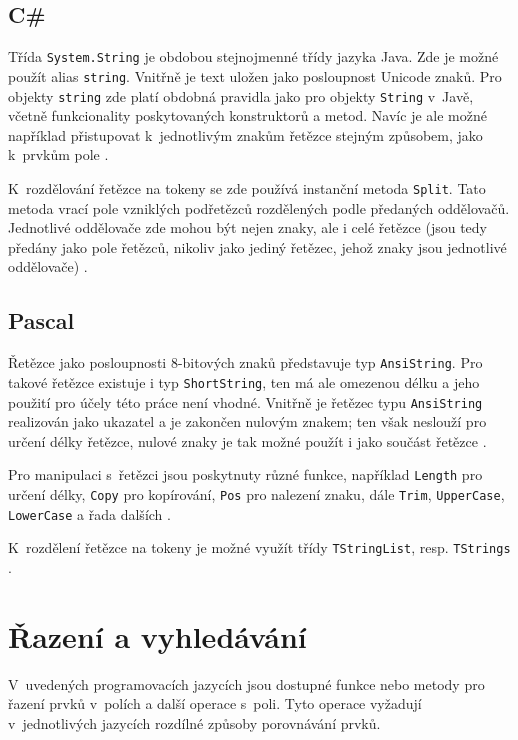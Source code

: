 \documentclass{bakalarka}
\begin{document}
\subsection{C\#}
Třída \texttt{System.String} je obdobou stejnojmenné třídy jazyka Java. Zde je možné použít alias \texttt{string}. Vnitřně je text uložen jako posloupnost Unicode znaků. Pro objekty \texttt{string} zde platí obdobná pravidla jako pro objekty \texttt{String} v~Javě, včetně funkcionality poskytovaných konstruktorů a metod. Navíc je ale možné například přistupovat k~jednotlivým znakům řetězce stejným způsobem, jako k~prvkům pole \cite{cs-guide-stringclass}.\par
K~rozdělování řetězce na tokeny se zde používá instanční metoda \texttt{Split}. Tato metoda vrací pole vzniklých podřetězců rozdělených podle předaných oddělovačů. Jednotlivé oddělovače zde mohou být nejen znaky, ale i celé řetězce (jsou tedy předány jako pole řetězců, nikoliv jako jediný řetězec, jehož znaky jsou jednotlivé oddělovače) \cite{cs-guide-stringsplit}.

\subsection{Pascal}
Řetězce jako posloupnosti 8-bitových znaků představuje typ \texttt{AnsiString}. Pro takové řetězce existuje i typ \texttt{ShortString}, ten má ale omezenou délku a jeho použití pro účely této práce není vhodné. Vnitřně je řetězec typu \texttt{AnsiString} realizován jako ukazatel a je zakončen nulovým znakem; ten však neslouží pro určení délky řetězce, nulové znaky je tak možné použít i jako součást řetězce \cite{pas-guide-strings, pas-guide-shortstring, pas-guide-ansistring}.\par
Pro manipulaci s~řetězci jsou poskytnuty různé funkce, například \texttt{Length} pro určení délky, \texttt{Copy} pro kopírování, \texttt{Pos} pro nalezení znaku, dále \texttt{Trim}, \texttt{UpperCase}, \texttt{LowerCase} a řada dalších \cite{pas-guide-system}.\par
K~rozdělení řetězce na tokeny je možné využít třídy \texttt{TStringList}, resp. \texttt{TStrings} \cite{pas-guide-tstringlist, pas-guide-tstrings}.

\section{Řazení a vyhledávání}\label{sec:sorting}
V~uvedených programovacích jazycích jsou dostupné funkce nebo metody pro řazení prvků v~polích a další operace s~poli. Tyto operace vyžadují v~jednotlivých jazycích rozdílné způsoby porovnávání prvků.
\end{document}
